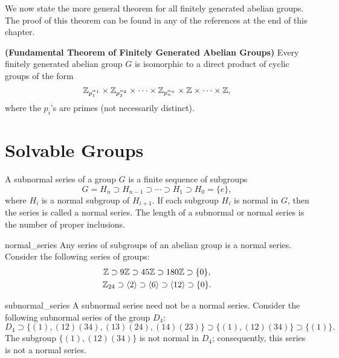  
We now state the more general theorem for all finitely generated
abelian groups.  The proof of this theorem can be found in any of the 
references at the end of this chapter.
 
 
\begin{theorem}
{\bf (Fundamental Theorem of Finitely Generated Abelian Groups)}
Every finitely generated abelian group $G$ is isomorphic to a direct
product of cyclic groups of the form 
\[
{\Bbb Z}_{p_1^{ \alpha_1 }}
\times
{\Bbb Z}_{p_2^{ \alpha_2 }}
\times
\cdots
\times
{\Bbb Z}_{p_n^{ \alpha_n }}
\times
{\Bbb Z}
\times \cdots \times
{\Bbb Z},
\]
where the $p_i$'s are primes (not necessarily distinct).
\end{theorem}

 
\section{Solvable Groups}

A {\bfi subnormal series\/} 
of a group $G$ is a finite sequence of subgroups 
\[
G = H_n \supset H_{n-1} \supset \cdots \supset H_1 \supset
H_0 = \{ e \},
\]
where $H_i$ is a normal subgroup of $H_{i+1}$. If each subgroup $H_i$
is normal in $G$, then the series is called a {\bfi normal
series}. The {\bfi length\/} of a 
subnormal or normal series is the number of proper inclusions. 
 

\begin{example}{normal_series}
Any series of subgroups of an abelian group is a normal series.
Consider the following  series of groups: 
\begin{gather*}
{\Bbb Z} \supset 9{\Bbb Z} \supset 45{\Bbb Z} \supset 180{\Bbb Z} 
\supset \{0\}, \\
{\Bbb Z}_{24} \supset \langle 2 \rangle \supset \langle 6 \rangle 
\supset \langle 12 \rangle
\supset \{0\}.
\end{gather*}
\end{example}
 
 
\begin{example}{subnormal_series}
A subnormal series need not be a normal series.  Consider the
following subnormal series of the group $D_4$: 
\[
D_4 \supset \{ (1),
(12)(34), (13)(24), (14)(23) \} \supset  \{  (1), (12)(34) \} 
\supset \{ (1) \}.
\]
The subgroup $\{  (1), (12)(34) \}$ is not normal in $D_4$;
consequently, this series is not a normal series.
\end{example}


